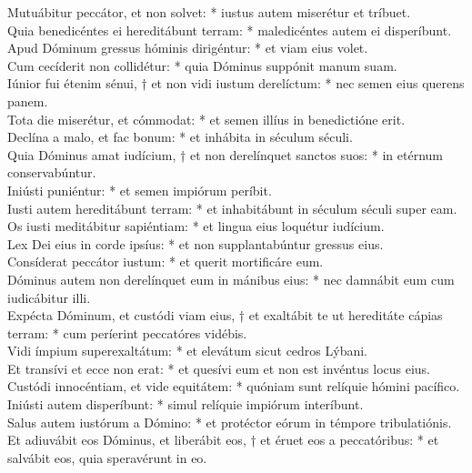 {	Mutuábitur peccátor, et non solvet: * iustus autem miserétur et tríbuet. \\
	Quia benedicéntes ei hereditábunt terram: * maledicéntes autem ei disperíbunt. \\
	Apud Dóminum gressus hóminis dirigéntur: * et viam eius volet. \\
	Cum cecíderit non collidétur: * quia Dóminus suppónit manum suam. \\
	Iúnior fui étenim sénui, † et non vidi iustum derelíctum: * nec semen eius querens panem. \\
	Tota die miserétur, et cómmodat: * et semen illíus in benedictióne erit. \\
	Declína a malo, et fac bonum: * et inhábita in séculum séculi. \\
	Quia Dóminus amat iudícium, † et non derelínquet sanctos suos: * in etérnum conservabúntur. \\
	Iniústi puniéntur: * et semen impiórum períbit. \\
	Iusti autem hereditábunt terram: * et inhabitábunt in séculum séculi super eam. \\
	Os iusti meditábitur sapiéntiam: * et lingua eius loquétur iudícium. \\
	Lex Dei eius in corde ipsíus: * et non supplantabúntur gressus eius. \\
	Consíderat peccátor iustum: * et querit mortificáre eum. \\
	Dóminus autem non derelínquet eum in mánibus eius: * nec damnábit eum cum iudicábitur illi. \\%
	Expécta Dóminum, et custódi viam eius, † et exaltábit te ut hereditáte cápias terram: * cum períerint peccatóres vidébis. \\
	Vidi ímpium superexaltátum: * et elevátum sicut cedros Lýbani. \\
	Et transívi et ecce non erat: * et quesívi eum et non est invéntus locus eius. \\
	Custódi innocéntiam, et vide equitátem: * quóniam sunt relíquie hómini pacífico. \\
	Iniústi autem disperíbunt: * simul relíquie impiórum interíbunt. \\
	Salus autem iustórum a Dómino: * et protéctor eórum in témpore tribulatiónis. \\
	Et adiuvábit eos Dóminus, et liberábit eos, † et éruet eos a peccatóribus: * et salvábit eos, quia speravérunt in eo.
}

